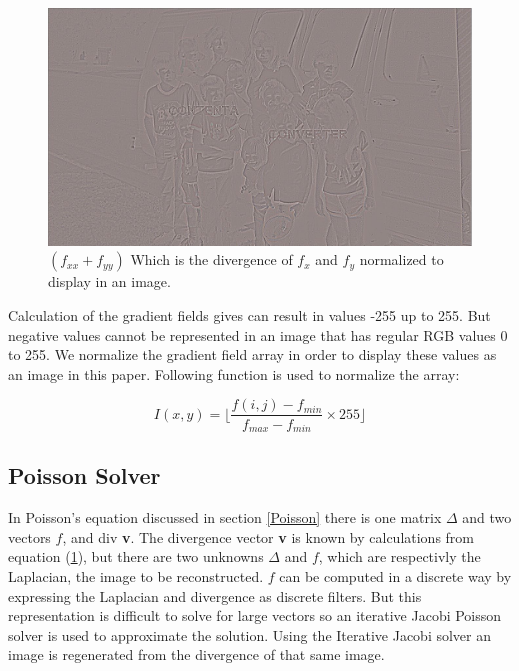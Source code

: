 \documentclass[10pt,twopage]{acmsiggraph}
\begin{document}
\begin{figure}
\centering
\includegraphics[width=.44\textwidth]{fig/divG.jpg}
\caption{\ensuremath{(f_{xx} + f_{yy})} Which is the divergence of \ensuremath{f_{x}} and \ensuremath{f_{y}} normalized to display in an image.}
\label{div}
\end{figure}

Calculation of the gradient fields gives can result in values -255 up to 255. But negative values cannot be represented in an image that has regular RGB values 0 to 255.  We normalize the gradient field array in order to display these values as an image in this paper. Following function is used to normalize the array:

\begin{equation}
\label{normalize}
\ensuremath{I(x,y) = \lfloor\frac{f(i,j) - f_{min}}{f_{max} - f_{min}} \times 255 \rfloor}
\end{equation}

\subsection{Poisson Solver}

In Poisson's equation discussed in section \ref{Poisson} there is one matrix \ensuremath{\Delta} and two vectors $f$, and div {\bf v}. The divergence vector {\bf v} is known by calculations from equation (\ref{div}), but there are two unknowns \ensuremath{\Delta} and $f$, which are respectivly the Laplacian, the image to be reconstructed. $f$ can be computed in a discrete way by expressing the Laplacian and divergence as discrete filters.  But this representation is difficult to solve for large vectors so an iterative Jacobi Poisson solver is used to approximate the solution. Using the Iterative Jacobi solver an image is regenerated from the divergence of that same image. 
\end{document}
